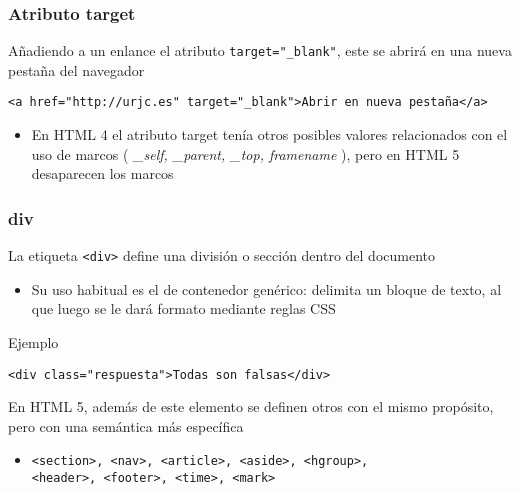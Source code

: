 \documentclass[ucs]{beamer}
\begin{document}
\begin{frame}[fragile]
\frametitle{Atributo target}
Añadiendo a un enlance el atributo \verb|target="_blank"|, este
se abrirá en una nueva pestaña del navegador

  \begin{footnotesize}
  \begin{verbatim}
<a href="http://urjc.es" target="_blank">Abrir en nueva pestaña</a>
  \end{verbatim}
  \end{footnotesize}

\begin{itemize}
\item
En HTML 4 el atributo target tenía otros posibles valores relacionados
con el uso de marcos 
(
\emph{\_self, \_parent, \_top, framename}
),
pero en HTML 5 desaparecen los marcos
\end{itemize}

\end{frame}



\begin{frame}[fragile]
\frametitle{div}

La etiqueta \verb|<div>| define una división o sección dentro del documento
\begin{itemize}
\item
Su uso habitual es el de contenedor genérico: delimita un bloque de texto, al que luego
se le dará formato mediante reglas CSS
\end{itemize}

Ejemplo

  \begin{footnotesize}
  \begin{verbatim}
<div class="respuesta">Todas son falsas</div>
  \end{verbatim}
  \end{footnotesize}

En HTML 5, además de este elemento se definen otros con el mismo propósito, pero con una semántica
más específica

    \begin{itemize}
    \item
  \begin{footnotesize}
  \begin{verbatim}
<section>, <nav>, <article>, <aside>, <hgroup>, 
<header>, <footer>, <time>, <mark>
  \end{verbatim}
  \end{footnotesize}
    \end{itemize}


\end{frame}
\end{document}
